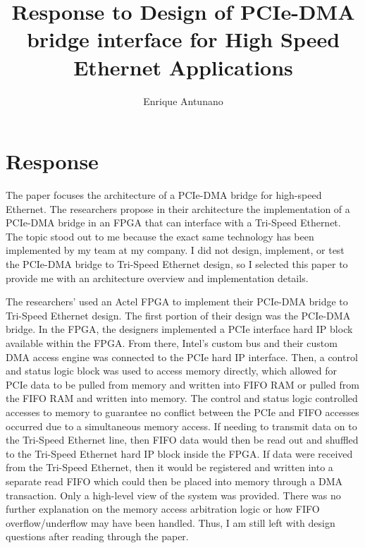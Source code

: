 \documentclass{article}
\title{Response to Design of PCIe-DMA bridge interface for High
Speed Ethernet Applications}
\author{Enrique Antunano}
\begin{document}
\maketitle

\section{Response}
The paper focuses the architecture of a PCIe-DMA bridge for high-speed Ethernet. The researchers propose in their architecture the implementation of a PCIe-DMA bridge in an FPGA that can interface with a Tri-Speed Ethernet. The topic stood out to me because the exact same technology has been implemented by my team at my company. I did not design, implement, or test the PCIe-DMA bridge to Tri-Speed Ethernet design, so I selected this paper to provide me with an architecture overview and implementation details. 

The researchers' used an Actel FPGA to implement their PCIe-DMA bridge to Tri-Speed Ethernet design. The first portion of their design was the PCIe-DMA bridge. In the FPGA, the designers implemented a PCIe interface hard IP block available within the FPGA. From there, Intel's custom bus and their custom DMA access engine was connected to the PCIe hard IP interface. Then, a control and status logic block was used to access memory directly, which allowed for PCIe data to be pulled from memory and written into FIFO RAM or pulled from the FIFO RAM and written into memory. The control and status logic controlled accesses to memory to guarantee no conflict between the PCIe and FIFO accesses occurred due to a simultaneous memory access. If needing to transmit data on to the Tri-Speed Ethernet line, then FIFO data would then be read out and shuffled to the Tri-Speed Ethernet hard IP block inside the FPGA. If data were received from the Tri-Speed Ethernet, then it would be registered and written into a separate read FIFO which could then be placed into memory through a DMA transaction. Only a high-level view of the system was provided. There was no further explanation on the memory access arbitration logic or how FIFO overflow/underflow may have been handled. Thus, I am still left with design questions after reading through the paper.
\end{document}
